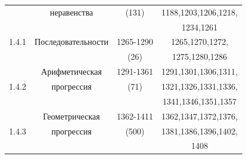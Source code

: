 \begin{table}[H]
\begin{center}
\begin{tabular}{|c|c|c|c|}
~ & неравенства & (131) & 1188,1203,1206,1218,\\
~ & ~ & ~ & 1234,1261\\
\hline
1.4.1 & Последовательности & 1265-1290 & 1265,1270,1272,\\
~ & ~ & (26) & 1275,1280,1286\\
\hline
~ & Арифметическая & 1291-1361 & 1291,1301,1306,1311,\\
1.4.2 & прогрессия & (71) & 1321,1326,1331,1336,\\
~ & ~ & ~ & 1341,1346,1351,1357\\
\hline
~ & Геометрическая & 1362-1411 & 1362,1347,1372,1376,\\
1.4.3 & прогрессия & (500) & 1381,1386,1396,1402,\\
~ & ~ & ~ & 1408\\
\hline
\end{tabular}
\end{center}
\end{table}



